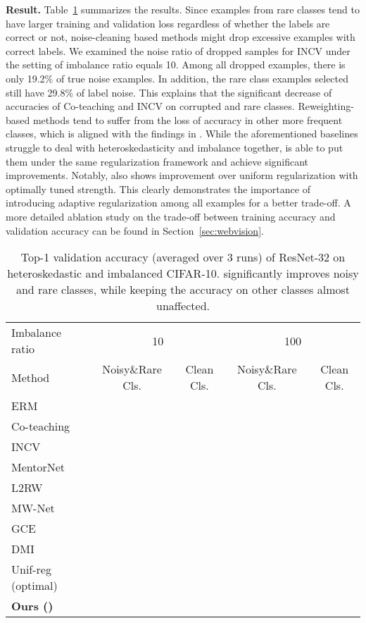 \textbf{Result.} Table~\ref{tab:CIFAR_imb} summarizes the results. Since examples from rare classes tend to have larger training and validation loss regardless of whether the labels are correct or not, noise-cleaning based methods might drop excessive examples with correct labels. We examined the noise ratio of dropped samples for INCV under the setting of imbalance ratio equals 10. Among all dropped examples, there is only 19.2\% of true noise examples. In addition, the rare class examples selected still have 29.8\% of label noise. This explains that the significant decrease of accuracies of Co-teaching and INCV on corrupted and rare classes. Reweighting-based methods tend to suffer from the loss of accuracy in other more frequent classes, which is aligned with the findings in \citet{cao2019learning}. While the aforementioned baselines struggle to deal with heteroskedasticity and imbalance together, \ours{} is able to put them under the same regularization framework and achieve significant improvements. Notably, \ours{} also shows improvement over uniform regularization with optimally tuned strength. This clearly demonstrates the importance of introducing adaptive regularization among all examples for a better trade-off. A more detailed ablation study on the trade-off between training accuracy and validation accuracy can be found in Section~\ref{sec:webvision}.

\begin{table}[t]
\centering
\caption{Top-1 validation accuracy (averaged over 3 runs) of ResNet-32 on heteroskedastic and imbalanced CIFAR-10. \ours{} significantly improves noisy and rare classes, while keeping the accuracy on other classes almost unaffected.}

\label{tab:CIFAR_imb}
{\small
\begin{tabular}{lcc|cc}
\toprule
Imbalance ratio             & \multicolumn{2}{c|}{10}        & \multicolumn{2}{c}{100}                \\
Method            & Noisy\&Rare Cls.  &  Clean Cls.    &  Noisy\&Rare Cls.    & Clean Cls. \\ \midrule
ERM &  &  &  &  \\ 
Co-teaching &  &  &  &  \\ 
INCV &  &  &  &  \\ 
MentorNet &  &  &  &  \\ 
L2RW &  &  &  &  \\ 
MW-Net &  &  &  &  \\
GCE &  &  &  &  \\
DMI &  &  &  &  \\
\midrule
Unif-reg (optimal) &  &  &  &  \\ 
\textbf{Ours (\ours{})} &  &  &  &  \\ 
\bottomrule
\end{tabular}}
\end{table}

